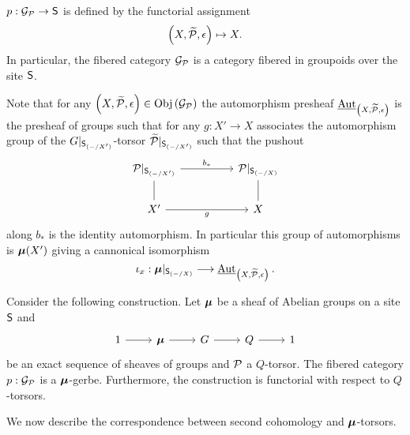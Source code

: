 \begin{remark}
    $p:\mathcal{G}_{\mathcal{P}}\to\mathsf{S}$ is defined by the functorial assignment 
    $$\left(X,\widetilde{\mathcal{P}},\epsilon\right)\mapsto X.$$
    In particular, the fibered category $\mathcal{G}_{\mathcal{P}}$ is a category fibered in groupoids over the site $\mathsf{S}$. 
\end{remark}
Note that for any $\left(X,\widetilde{\mathcal{P}},\epsilon\right)\in\mathrm{Obj}\left(\mathcal{G}_{\mathcal{P}}\right)$ the automorphism presheaf $\operatorname{\underline{\mathrm{Aut}}}_{\left(X,\widetilde{\mathcal{P}},\epsilon\right)}$ is the presheaf of groups such that for any $g:X'\to X$ associates the automorphism group of the $G|_{\mathsf{S}_{(-/X')}}$-torsor $\widetilde{\mathcal{P}}|_{\mathsf{S}_{(-/X')}}$ such that the pushout 
$$%
\begin{tikzcd}
	{\Pcal|_{\Ssf_{(-/X')}}} && {\Pcal|_{\Ssf_{(-/X)}}} \\
	{X'} && X
	\arrow[no head, from=1-3, to=2-3]
	\arrow[no head, from=1-1, to=2-1]
	\arrow["g"', from=2-1, to=2-3]
	\arrow["{b_{*}}", from=1-1, to=1-3]
\end{tikzcd}$$
along $b_{*}$ is the identity automorphism. In particular this group of automorphisms is $\bm{\mu}(X')$ giving a cannonical isomorphism 
$$\iota_{x}:\bm{\mu}|_{\mathsf{S}_{(-/X)}}\longrightarrow\operatorname{\underline{\mathrm{Aut}}}_{\left(X,\widetilde{\mathcal{P}},\epsilon\right)}.$$
\begin{proposition}\label{prop: g sub p is a mu gerbe}
    Consider the following construction. Let $\bm{\mu}$ be a sheaf of Abelian groups on a site $\mathsf{S}$ and 
    $$%
    \begin{tikzcd}
	1 & \Bmu & G & Q & 1
	\arrow[from=1-1, to=1-2]
	\arrow[from=1-2, to=1-3]
	\arrow[from=1-3, to=1-4]
	\arrow[from=1-4, to=1-5]
    \end{tikzcd}$$
    be an exact sequence of sheaves of groups and $\mathcal{P}$ a $Q$-torsor. The fibered category $p:\mathcal{G}_{\mathcal{P}}$ is a $\bm{\mu}$-gerbe. Furthermore, the construction is functorial with respect to $Q$-torsors. 
\end{proposition}
We now describe the correspondence between second cohomology and $\bm{\mu}$-torsors. 
\\\\
